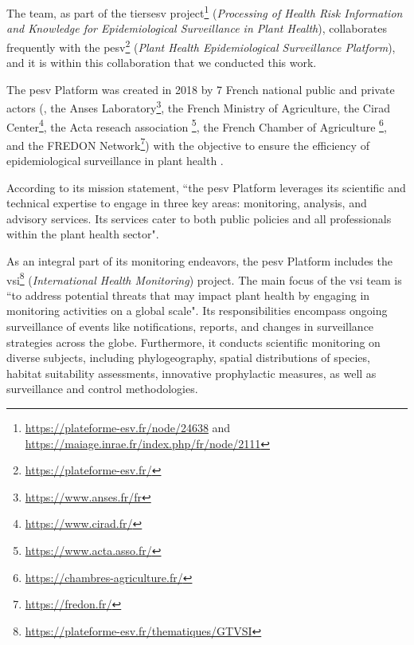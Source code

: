 \label{01_pesv_platform}



The \bibliome{} team, as part of the \gls{tiersesv} project\footnote{\url{https://plateforme-esv.fr/node/24638} and \url{https://maiage.inrae.fr/index.php/fr/node/2111}} (\emph{Processing of Health Risk Information and Knowledge for Epidemiological Surveillance in Plant Health}), collaborates frequently with the 
 \gls{pesv}\footnote{\url{https://plateforme-esv.fr/}} (\emph{Plant Health Epidemiological Surveillance Platform}),  and it is within this collaboration that we conducted this work.


The \gls{pesv} Platform was created in 2018 by 
7 French national public and private actors (\INRAE{},
the Anses Laboratory\footnote{\url{https://www.anses.fr/fr}}, 
the French Ministry of Agriculture, the Cirad Center\footnote{\url{https://www.cirad.fr/}}, the Acta reseach association \footnote{\url{https://www.acta.asso.fr/}},
the French Chamber of Agriculture \footnote{\url{https://chambres-agriculture.fr/}}, 
and the FREDON Network\footnote{\url{https://fredon.fr/}})  with  the objective to ensure the efficiency of epidemiological surveillance in plant health  .


According to its mission statement, ``the \gls{pesv} Platform leverages its scientific and technical expertise to engage in three key areas: monitoring, analysis, and advisory services. Its services cater to both public policies and all professionals within the plant health sector".

As an integral part of its monitoring endeavors, the \gls{pesv} Platform includes the \gls{vsi}\footnote{\url{https://plateforme-esv.fr/thematiques/GTVSI}} (\emph{International Health Monitoring})  project. The main focus of the \gls{vsi} team is ``to address potential threats that may impact plant health by engaging in monitoring activities on a global scale". Its responsibilities encompass ongoing surveillance of events like notifications, reports, and changes in surveillance strategies across the globe. Furthermore, it conducts scientific monitoring on diverse subjects, including phylogeography, spatial distributions of species, habitat suitability assessments, innovative prophylactic measures, as well as surveillance and control methodologies.



\iffalse
{}
\label{01_sanba_metaprogram}

